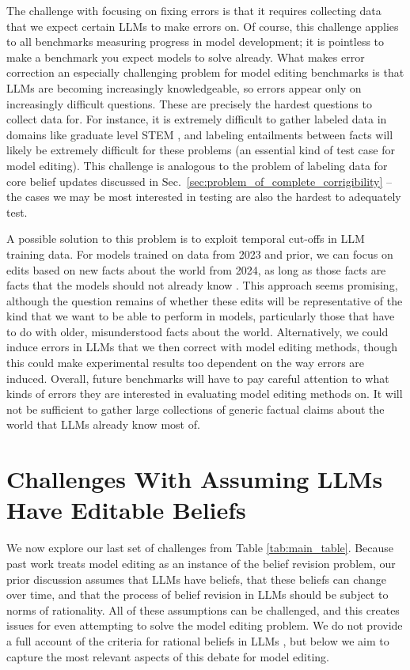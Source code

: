 \documentclass[11pt,a4paper]{article}
\begin{document}
The challenge with focusing on fixing errors is that it requires collecting data that we expect certain LLMs to make errors on. Of course, this challenge applies to all benchmarks measuring progress in model development; it is pointless to make a benchmark you expect models to solve already. What makes error correction an especially challenging problem for model editing benchmarks is that LLMs are becoming increasingly knowledgeable, so errors appear only on increasingly difficult questions. These are precisely the hardest questions to collect data for. For instance, it is extremely difficult to gather labeled data in domains like graduate level STEM \citep{rein2023gpqa}, and labeling entailments between facts will likely be extremely difficult for these problems (an essential kind of test case for model editing). 
This challenge is analogous to the problem of labeling data for core belief updates discussed in Sec.~\ref{sec:problem_of_complete_corrigibility} -- the cases we may be most interested in testing are also the hardest to adequately test. 

A possible solution to this problem is to exploit temporal cut-offs in LLM training data. For models trained on data from 2023 and prior, we can focus on edits based on new facts about the world from 2024, as long as those facts are facts that the models should not already know \cite[see e.g.][]{dhingra2022time, fierro2024mulan}. This approach seems promising, although the question remains of whether these edits will be representative of the kind that we want to be able to perform in models, particularly those that have to do with older, misunderstood facts about the world. Alternatively, we could induce errors in LLMs that we then correct with model editing methods, though this could make experimental results too dependent on the way errors are induced. Overall, future benchmarks will have to pay careful attention to what kinds of errors they are interested in evaluating model editing methods on. It will not be sufficient to gather large collections of generic factual claims about the world that LLMs already know most of. 

\section{Challenges With Assuming LLMs Have Editable Beliefs}
\label{sec:challenges_editable_LLMs}
We now explore our last set of challenges from Table \ref{tab:main_table}.
Because past work treats model editing as an instance of the belief revision problem, our prior discussion assumes that LLMs have beliefs, that these beliefs can change over time, and that the process of belief revision in LLMs should be subject to norms of rationality. All of these assumptions can be challenged, and this creates issues for even attempting to solve the model editing problem. We do not provide a full account of the criteria for rational beliefs in LLMs 
\cite[for such a discussion, see][]{hofweber2024language}, but below we aim to capture the most relevant aspects of this debate for model editing. 
\end{document}
